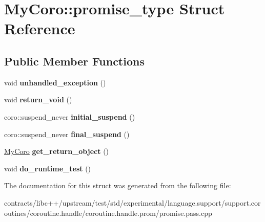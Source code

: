 \hypertarget{struct_my_coro_1_1promise__type}{}\section{My\+Coro\+:\+:promise\+\_\+type Struct Reference}
\label{struct_my_coro_1_1promise__type}
\subsection*{Public Member Functions}
\begin{DoxyCompactItemize}
\item 
\mbox{\label{struct_my_coro_1_1promise__type_ae6ad89745809caa20002c5b112c727e7}} 
void {\bfseries unhandled\+\_\+exception} ()
\item 
\mbox{\label{struct_my_coro_1_1promise__type_a3928a082c925ec6ecc5ce4b965d13ce9}} 
void {\bfseries return\+\_\+void} ()
\item 
\mbox{\label{struct_my_coro_1_1promise__type_adadd39eac2d08cc76f339c19258c1f4b}} 
coro\+::suspend\+\_\+never {\bfseries initial\+\_\+suspend} ()
\item 
\mbox{\label{struct_my_coro_1_1promise__type_a884429871679b9b932f657968c0223b7}} 
coro\+::suspend\+\_\+never {\bfseries final\+\_\+suspend} ()
\item 
\mbox{\label{struct_my_coro_1_1promise__type_af76551916e6246eb163d43f924950793}} 
\mbox{\hyperlink{struct_my_coro}{My\+Coro}} {\bfseries get\+\_\+return\+\_\+object} ()
\item 
\mbox{\label{struct_my_coro_1_1promise__type_acf280737e1d48fd659d8043e660fe8e3}} 
void {\bfseries do\+\_\+runtime\+\_\+test} ()
\end{DoxyCompactItemize}


The documentation for this struct was generated from the following file\+:\begin{DoxyCompactItemize}
\item 
contracts/libc++/upstream/test/std/experimental/language.\+support/support.\+coroutines/coroutine.\+handle/coroutine.\+handle.\+prom/promise.\+pass.\+cpp\end{DoxyCompactItemize}
